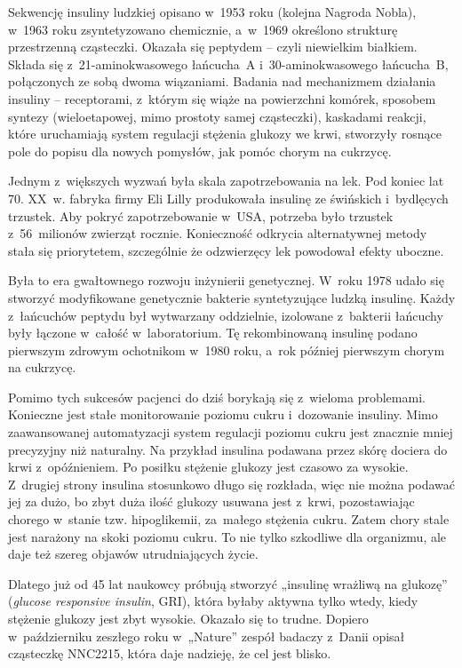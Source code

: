 \vspace*{\parskip}
\begin{dwieszpalty}
Sekwencję insuliny ludzkiej opisano w~1953 roku (kolejna Nagroda Nobla), w~1963 roku zsyntetyzowano chemicznie, a~w~1969 określono strukturę przestrzenną cząsteczki. Okazała się peptydem – czyli niewielkim białkiem. Składa się z~21-aminokwasowego łańcucha~A i~30-aminokwasowego łańcucha~B, połączonych ze sobą dwoma wiązaniami. Badania nad mechanizmem działania insuliny – receptorami, z~którym się wiąże na powierzchni komórek, sposobem syntezy (wieloetapowej, mimo prostoty samej cząsteczki), kaskadami reakcji, które uruchamiają system regulacji stężenia glukozy we krwi, stworzyły rosnące pole do popisu dla nowych pomysłów, jak pomóc chorym na cukrzycę.

Jednym z~większych wyzwań była skala zapotrzebowania na lek. Pod koniec lat 70. XX~w. fabryka firmy Eli Lilly produkowała insulinę ze świńskich i~bydlęcych trzustek. Aby pokryć zapotrzebowanie w~USA, potrzeba było trzustek z~56~milionów zwierząt rocznie.  Konieczność odkrycia alternatywnej metody stała się priorytetem, szczególnie że odzwierzęcy lek powodował efekty uboczne.

Była to era gwałtownego rozwoju inżynierii genetycznej. W~roku 1978 udało się stworzyć  modyfikowane genetycznie bakterie syntetyzujące ludzką insulinę. Każdy z~łańcuchów peptydu był wytwarzany oddzielnie, izolowane z~bakterii łańcuchy były łączone w~całość w~laboratorium. Tę rekombinowaną insulinę podano pierwszym zdrowym ochotnikom w~1980 roku, a~rok później pierwszym chorym na cukrzycę.

Pomimo
tych sukcesów pacjenci do dziś borykają się
z~wieloma problemami. Konieczne jest stałe monitorowanie poziomu cukru i~dozowanie insuliny. Mimo zaawansowanej automatyzacji system regulacji poziomu cukru jest znacznie mniej precyzyjny niż naturalny. Na przykład insulina podawana przez skórę dociera do krwi z~opóźnieniem. Po posiłku stężenie glukozy jest czasowo za wysokie. Z~drugiej strony insulina stosunkowo długo się rozkłada, więc nie można podawać jej za dużo, bo zbyt duża ilość glukozy usuwana jest z~krwi, pozostawiając chorego w~stanie tzw. hipoglikemii, za~małego stężenia cukru. Zatem chory stale jest narażony na skoki poziomu cukru. To nie tylko szkodliwe dla organizmu, ale daje też szereg objawów utrudniających życie.

Dlatego już od 45 lat naukowcy próbują stworzyć „insulinę wrażliwą na glukozę” ({\em glucose responsive insulin}, GRI), która byłaby aktywna tylko wtedy, kiedy stężenie glukozy jest zbyt wysokie. Okazało się to trudne. Dopiero w~październiku zeszłego roku w~„Nature” zespół badaczy z~Danii opisał cząsteczkę NNC2215, która daje nadzieję, że cel jest blisko.


\end{dwieszpalty}
